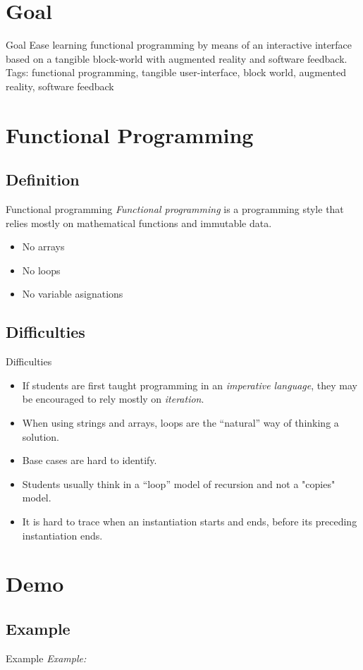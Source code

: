 \section{Goal}

\begin{frame}{Goal}
  Ease learning functional programming by means of an interactive
  interface based on a tangible block-world with augmented reality
  and software feedback.
  \vfill
  \textsf{Tags}: functional programming, tangible user-interface,
  block world, augmented reality, software feedback
\end{frame}

\section{Functional Programming}

  \subsection{Definition}
    \begin{frame}{Functional programming}
      \emph{Functional programming} is a programming style that relies mostly on
      mathematical functions and immutable data.
      \vfill
      \pause
      \begin{itemize}
        \item No arrays
        \item No loops
        \item No variable asignations
      \end{itemize}
    \end{frame}

    \subsection{Difficulties}
      \begin{frame}{Difficulties}
        \begin{itemize}
          \pause \item If students are first taught programming in
          an \emph{imperative language}, they may be encouraged to rely mostly on \emph{iteration}.
          \pause \item When using strings and arrays, loops are the ``natural'' way of thinking a solution.
          \pause \item Base cases are hard to identify.
          \pause \item Students usually think in a ``loop'' model of recursion
          and not a "copies" model.
          \pause \item It is hard to trace when an instantiation starts and
          ends, before its preceding instantiation ends.
        \end{itemize}
      \end{frame}

\section{Demo}
  \subsection{Example}
    \begin{frame}{Example}
      \emph{Example:}
      
    \end{frame}
